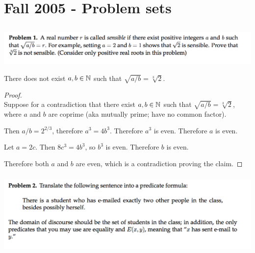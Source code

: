 \documentclass[12pt]{article}
\begin{document}
\section*{Fall 2005 - Problem sets}

\subsection*{}

\subsubsection{}
\begin{mdframed}
\includegraphics[width=400pt]{img/MIT-math-for-cs-2005-set-1-1.png}
\end{mdframed}


\begin{claim*}
  There does not exist $a, b \in \mathbb{N}$ such that $\sqrt{a/b} = \sqrt[3]{2}$.
\end{claim*}

\begin{proof}~\\
  Suppose for a contradiction that there exist $a, b \in \mathbb{N}$ such that $\sqrt{a/b} = \sqrt[3]{2}$,
  where $a$ and $b$ are coprime (aka mutually prime; have no common factor).

  Then $a/b = 2^{2/3}$, therefore $a^3 = 4b^3$. Therefore $a^3$ is even. Therefore $a$ is even.

  Let $a = 2c$. Then $8c^3 = 4b^3$, so $b^3$ is even. Therefore $b$ is even.

  Therefore both $a$ and $b$ are even, which is a contradiction proving the claim. \checkmark
\end{proof}

\newpage
\subsubsection{}
\begin{mdframed}
\includegraphics[width=400pt]{img/MIT-math-for-cs-2005-set-1-2.png}
\end{mdframed}
\end{document}
